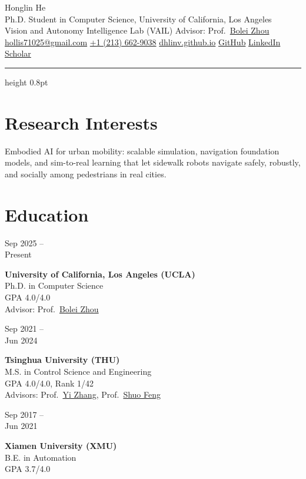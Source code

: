 \documentclass[letterpaper,10pt]{article}
\newlength{\gutter}\setlength{\gutter}{1.02in}
\newlength{\gutgap}\setlength{\gutgap}{0.14in}
\newlength{\bodycol}\setlength{\bodycol}{\textwidth-\gutter-\gutgap}
\newcommand{\entry}[2]{%
  \par\vspace{2pt}%
  \parbox[t]{\gutter}{\strut\small\color{keycol}\raggedright#1}%
  \hspace{\gutgap}%
  \parbox[t]{\bodycol}{\strut\raggedright#2}%
  \par}
\newcommand{\bolei}{\href{https://boleizhou.github.io/}{Bolei Zhou}}
\newcommand{\yizhang}{\href{https://www.au.tsinghua.edu.cn/info/1076/3242.htm}{Yi Zhang}}
\newcommand{\shuofeng}{\href{https://www.au.tsinghua.edu.cn/info/1076/3247.htm}{Shuo Feng}}
\begin{document}
{\Huge Honglin He}\\[4pt]
{\color{keycol}Ph.D. Student in Computer Science, University of California, Los Angeles}\\[2pt]
{\color{keycol}Vision and Autonomy Intelligence Lab (VAIL) \quad\textbullet\quad Advisor: Prof.~\bolei}\\[4pt]
\href{mailto:hollis71025@gmail.com}{hollis71025@gmail.com} \quad\textbullet\quad
\href{tel:+12136629038}{+1 (213) 662-9038} \quad\textbullet\quad
\href{https://dhlinv.github.io/}{dhlinv.github.io} \quad\textbullet\quad
\href{https://github.com/DhlinV}{GitHub} \quad\textbullet\quad
\href{https://www.linkedin.com/in/honglin-he-890474328/}{LinkedIn} \quad\textbullet\quad
\href{https://scholar.google.cz/citations?user=Y0Qrwg0AAAAJ&hl=zh-CN}{Scholar}

\vspace{4pt}
{\color{rulecol}\hrule height 0.8pt}

\section{Research Interests}
Embodied AI for urban mobility: scalable simulation, navigation foundation models, and
sim-to-real learning that let sidewalk robots navigate safely, robustly, and socially among
pedestrians in real cities.

\section{Education}

\entry{Sep 2025 --\\Present}{%
  \textbf{University of California, Los Angeles (UCLA)}\\
  Ph.D. in Computer Science\\
  GPA 4.0/4.0\\
  Advisor: Prof.~\bolei}

\entry{Sep 2021 --\\Jun 2024}{%
  \textbf{Tsinghua University (THU)}\\
  M.S. in Control Science and Engineering\\
  GPA 4.0/4.0, Rank 1/42\\
  Advisors: Prof.~\yizhang, Prof.~\shuofeng}

\entry{Sep 2017 --\\Jun 2021}{%
  \textbf{Xiamen University (XMU)}\\
  B.E. in Automation\\
  GPA 3.7/4.0}
\end{document}
